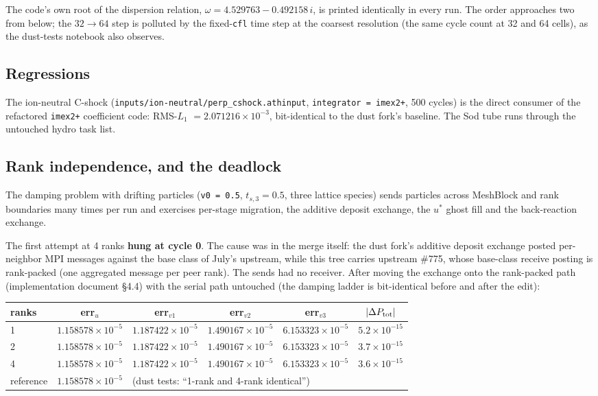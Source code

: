 \documentclass[11pt]{article}
\newcommand{\code}[1]{\texttt{#1}}
\newcommand{\file}[1]{\texttt{#1}}
\begin{document}
The code's own root of the dispersion relation, $\omega = 4.529763 - 0.492158\,i$,
is printed identically in every run. The order approaches two from below; the
$32 \to 64$ step is polluted by the fixed-\code{cfl} time step at the coarsest
resolution (the same cycle count at 32 and 64 cells), as the dust-tests notebook
also observes.

\subsection{Regressions}

The ion-neutral C-shock (\file{inputs/ion-neutral/perp\_cshock.athinput},
\code{integrator = imex2+}, 500 cycles) is the direct consumer of the refactored
\code{imex2+} coefficient code: RMS-$L_1$ $= 2.071216\times10^{-3}$, bit-identical to
the dust fork's baseline. The Sod tube runs through the untouched hydro task list.

\subsection{Rank independence, and the deadlock}
\label{sec:mpi}

The damping problem with drifting particles (\code{v0 = 0.5}, $t_{s,3} = 0.5$, three
lattice species) sends particles across MeshBlock and rank boundaries many times per
run and exercises per-stage migration, the additive deposit exchange, the $u^\ast$
ghost fill and the back-reaction exchange.

The first attempt at 4 ranks \textbf{hung at cycle 0}. The cause was in the merge
itself: the dust fork's additive deposit exchange posted per-neighbor MPI messages
against the base class of July's upstream, while this tree carries upstream \#775,
whose base-class receive posting is rank-packed (one aggregated message per peer
rank). The sends had no receiver. After moving the exchange onto the rank-packed
path (implementation document \S4.4) with the serial path untouched (the damping
ladder is bit-identical before and after the edit):

\begin{center}
\small
\begin{tabular}{@{}lccccc@{}}
\toprule
ranks & err$_u$ & err$_{v1}$ & err$_{v2}$ & err$_{v3}$ & $|\Delta P_{\rm tot}|$ \\
\midrule
1 & $1.158578\times10^{-5}$ & $1.187422\times10^{-5}$ & $1.490167\times10^{-5}$ & $6.153323\times10^{-5}$ & $5.2\times10^{-15}$ \\
2 & $1.158578\times10^{-5}$ & $1.187422\times10^{-5}$ & $1.490167\times10^{-5}$ & $6.153323\times10^{-5}$ & $3.7\times10^{-15}$ \\
4 & $1.158578\times10^{-5}$ & $1.187422\times10^{-5}$ & $1.490167\times10^{-5}$ & $6.153323\times10^{-5}$ & $3.6\times10^{-15}$ \\
\midrule
reference & $1.158578\times10^{-5}$ & \multicolumn{4}{l}{(dust tests: ``1-rank and 4-rank identical'')} \\
\bottomrule
\end{tabular}
\end{center}
\end{document}
